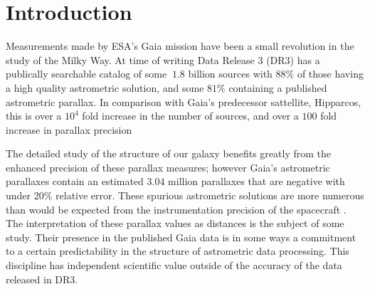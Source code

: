 \documentclass[preprint2]{aastex631}
\begin{document}

\section{Introduction} \label{sec:intro}


Measurements made by ESA's Gaia mission have been a small revolution in the study of the Milky Way. At time of writing Data Release 3 (DR3) has a publically searchable catalog of some $~1.8$ billion sources with $88\%$ of those having a high quality astrometric solution, and some $81\%$ containing a published astrometric parallax. In comparison with Gaia's predecessor sattellite, Hipparcos, this is over a $10^4$ fold increase in the number of sources, and over a $100$ fold increase in parallax precision \cite{perrymanHistory2012}

The detailed study of the structure of our galaxy benefits greatly from the enhanced precision of these parallax measures; however Gaia's astrometric parallaxes contain an estimated $3.04$ million parallaxes that are negative with under $20\%$ relative error. These spurious astrometric solutions are more numerous than would be expected from the instrumentation precision of the spacecraft \cite{fabriciusGaia2021}. The interpretation of these parallax values as distances is the subject of some study. Their presence in the published Gaia data is in some ways a commitment to a certain predictability in the structure of astrometric data processing. This discipline has independent scientific value outside of the accuracy of the data released in DR3.
\end{document}

